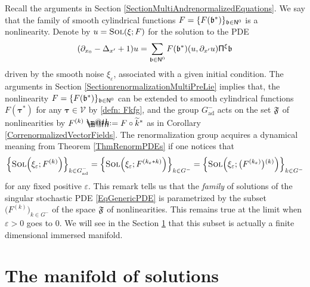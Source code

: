 \documentclass[10pt, reqno]{amsart}
\makeatletter
\numberwithin{subsection}{section}
\numberwithin{subsubsection}{subsection}
\numberwithin{equation}{section} %
\theoremstyle{mystyle}
\theoremstyle{mystyle2}
\theoremstyle{mystyle3}
\newcommand{\bstau}{\boldsymbol{\tau}}
\renewcommand{\epsilon}{\varepsilon}
\newcommand\mcV{\mathcal V}
\newcommand*{\defeq}{\mathrel{\rlap{%
                     \raisebox{0.3ex}{$\m@th\cdot$}}%
                     \raisebox{-0.3ex}{$\m@th\cdot$}}%
                     =}
\makeatother
\begin{document}
Recall the arguments in Section \ref{SectionMultiAndrenormalizedEquations}. We say that the family of smooth cylindrical functions $F=\{F(\frak{b}^*)\}_{\frak{b}\in{\sf N}^0}$ is a nonlinearity. Denote by $u=\textsc{Sol}(\xi ; F)$ for the solution to the PDE
$$
(\partial_{x_0}-\Delta_{x'}+1)u=\sum_{\frak{b}\in{\sf N}^0}F(\frak{b}^*)(u,\partial_{x'}u){\sf\Pi}^\xi\frak{b}
$$
driven by  the smooth noise $\xi_\epsilon$, associated with a given initial condition. 
The arguments in Section \ref{SectionrenormalizationMultiPreLie} implies that, the nonlinearity $F=\{F(\frak{b}^*)\}_{\frak{b}\in{\sf N}^0}$ can be extended to smooth cylindrical functions $F(\bstau^*)$ for any $\bstau\in\mcV$ by \eqref{defn: Fkfg}, and the group $G^-_\textrm{ad}$ acts on the set $\frak{F}$ of nonlinearities by $F^{(k)}\defeq F\circ\widetilde{k}^*$ as in Corollary \ref{CorrenormalizedVectorFields}. The renormalization group acquires a dynamical meaning from Theorem \ref{ThmRenormPDEs} if one notices that 
\begin{equation*}
\Big\{ \textsc{Sol}\Big(\xi_\epsilon ; F^{(k)}\Big)\Big\}_{k\in G^-_\textrm{ad}}
=
\Big\{ \textsc{Sol}\Big(\xi_\epsilon ; F^{(k_\epsilon*k)}\Big)\Big\}_{k\in G^-} 
= \Big\{ \textsc{Sol}\Big(\xi_\epsilon ; \big(F^{(k_\epsilon)}\big){}^{(k)}\Big)\Big\}_{k\in G^-}
 \end{equation*}   
for any fixed positive $\epsilon$. This remark tells us that the \emph{family} of solutions of the singular stochastic PDE \eqref{EqGenericPDE} is parametrized by the subset $\big(F^{(k)}\big)_{k\in G^-}$ of the space $\frak{F}$ of nonlinearities. This remains true at the limit when $\epsilon>0$ goes to $0$. We will see in the Section \ref{SectionManifold} that this subset is actually a finite dimensional immersed manifold.



\bigskip



\section{The manifold of solutions}   
\label{SectionManifold}
\end{document}
